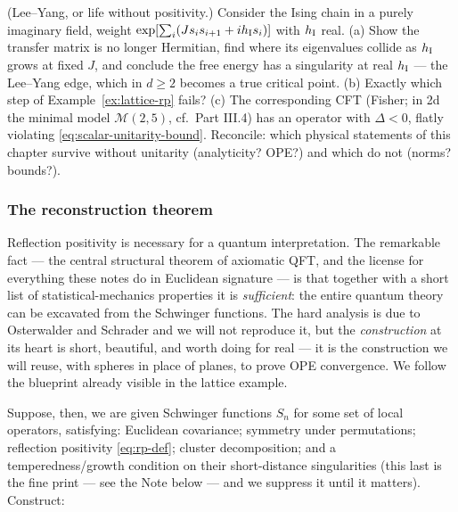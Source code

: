 \begin{exercise}[thinker]
\label{exr:lee-yang}
(Lee--Yang, or life without positivity.) Consider the Ising chain in a purely
imaginary field, weight $\exp[\sum_i (J s_i s_{i+1} + i h_{\rm I} s_i)]$ with
$h_{\rm I}$ real. (a) Show the transfer matrix is no longer Hermitian, find
where its eigenvalues collide as $h_{\rm I}$ grows at fixed $J$, and conclude
the free energy has a singularity at real $h_{\rm I}$ --- the Lee--Yang edge,
which in $d \ge 2$ becomes a true critical point. (b) Exactly which step of
Example~\ref{ex:lattice-rp} fails? (c) The corresponding CFT (Fisher; in 2d the
minimal model $\mathcal{M}(2,5)$, cf.\ Part III.4) has an operator with
$\Delta < 0$, flatly violating \eqref{eq:scalar-unitarity-bound}. Reconcile:
which physical statements of this chapter survive without unitarity
(analyticity? OPE?) and which do not (norms? bounds?).
\end{exercise}

\subsubsection{The reconstruction theorem}
\label{sec:os-reconstruction}

Reflection positivity is necessary for a quantum interpretation. The
remarkable fact --- the central structural theorem of axiomatic QFT, and the
license for everything these notes do in Euclidean signature --- is that
together with a short list of statistical-mechanics properties it is
\emph{sufficient}: the entire quantum theory can be excavated from the
Schwinger functions. The hard analysis is due to Osterwalder and Schrader and
we will not reproduce it, but the \emph{construction} at its heart is short,
beautiful, and worth doing for real --- it is the construction we will reuse,
with spheres in place of planes, to prove OPE convergence. We follow the
blueprint already visible in the lattice example.

Suppose, then, we are given Schwinger functions $S_n$ for some set of local
operators, satisfying: Euclidean covariance; symmetry under permutations;
reflection positivity \eqref{eq:rp-def}; cluster decomposition; and a
temperedness/growth condition on their short-distance singularities (this last
is the fine print --- see the Note below --- and we suppress it until it
matters). Construct:

